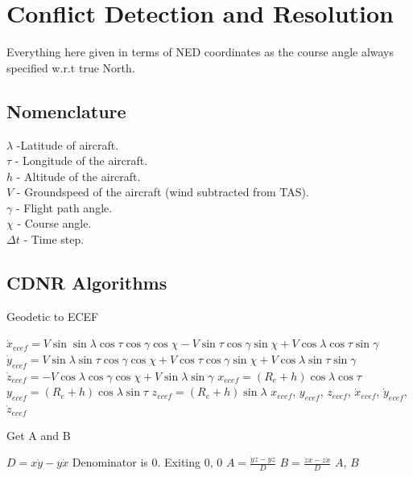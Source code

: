 \documentclass[11pt]{book}              %
\begin{document}
\section{Conflict Detection and Resolution}
Everything here given in terms of NED coordinates as the course angle always specified w.r.t true North. 
\subsection{Nomenclature}
$\lambda$ -Latitude of aircraft.\\
$\tau$ - Longitude of the aircraft.\\ 
$h$ - Altitude of the aircraft.\\
$V$ - Groundspeed of the aircraft (wind subtracted from TAS).\\
$\gamma$ - Flight path angle.\\
$\chi$ - Course angle.\\
$\Delta t$ - Time step.\\
\subsection{CDNR Algorithms}

\begin{algorithm}[H]
\caption{Geodetic to ECEF}\label{alg:CDNRAlgo0}
\begin{algorithmic}[1]
\State $\dot{x}_{ecef} = V\sin\sin\lambda\cos\tau\cos\gamma\cos\chi-V\sin\tau\cos\gamma\sin\chi+V\cos\lambda\cos\tau\sin\gamma$
\State $\dot{y}_{ecef} = V\sin\lambda\sin\tau\cos\gamma\cos\chi + V\cos\tau\cos\gamma\sin\chi +V\cos\lambda\sin\tau\sin\gamma $
\State $\dot{z}_{ecef} = -V\cos\lambda\cos\gamma\cos\chi  +V\sin\lambda\sin\gamma $
\State $x_{ecef} = (R_e+h)\cos\lambda\cos\tau$
\State $y_{ecef} = (R_e+h)\cos\lambda\sin\tau$
\State $z_{ecef} = (R_e+h)\sin\lambda$
\State \Return $x_{ecef}$, $y_{ecef}$, $z_{ecef}$, $\dot{x}_{ecef}$, $\dot{y}_{ecef}$, $\dot{z}_{ecef}$
\EndProcedure
\end{algorithmic}
\end{algorithm}


\begin{algorithm}[H]
\caption{Get A and B}\label{alg:CDNRAlgo1}
\begin{algorithmic}[1]
\State $D = x\dot{y}-y\dot{x}$
\State Denominator is 0. Exiting
\State \Return $0$, $0$
\EndIf
\State $A = \frac{\dot{y}z-y\dot{z}}{D}$
\State $B = \frac{\dot{z}x-z\dot{x}}{D}$
\State \Return $A$, $B$
\EndProcedure
\end{algorithmic}
\end{algorithm}
\end{document}
